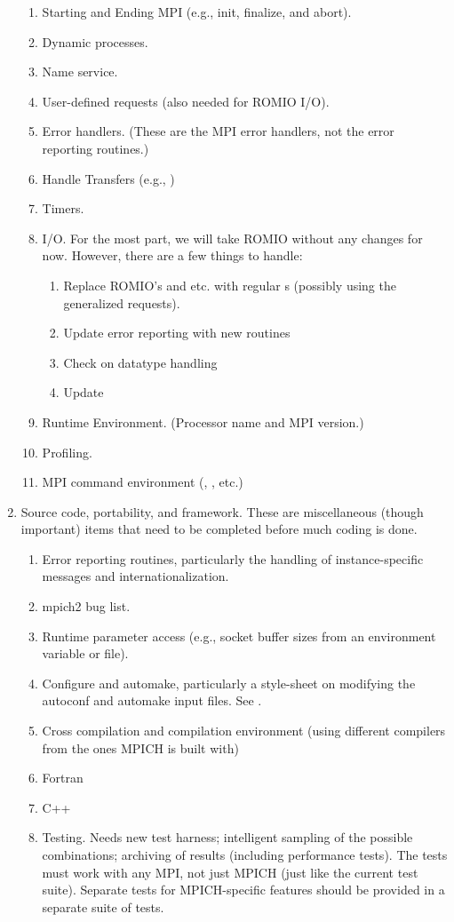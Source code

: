 \documentclass{article}
\begin{document}
\begin{enumerate}
\begin{enumerate}
  \item Starting and Ending MPI (e.g., init, finalize, and abort).
  \item Dynamic processes.
  \item Name service.
  \item User-defined requests (also needed for ROMIO I/O).
  \item Error handlers. (These are the MPI error handlers, not the error
    reporting routines.)
  \item Handle Transfers (e.g., )
  \item Timers.
  \item I/O.  For the most part, we will take ROMIO without any changes for
    now.  However, there are a few things to handle:
    \begin{enumerate}
    \item Replace ROMIO's  and  etc. with
      regular s (possibly using the generalized requests).
    \item Update error reporting with new routines
    \item Check on datatype handling
    \item Update 
    \end{enumerate}
  \item Runtime Environment.  (Processor name and MPI version.)
  \item Profiling.
  \item MPI command environment (, , etc.)
  \end{enumerate}
\item Source code, portability, and framework.
  These are miscellaneous (though important) items that need to be completed
  before much coding is done.

  \begin{enumerate}
  \item Error reporting routines, particularly the handling of
    instance-specific messages and internationalization.
  \item mpich2 bug list.
  \item Runtime parameter access (e.g., socket buffer sizes from an
    environment variable or  file).
  \item Configure and automake, particularly a style-sheet on modifying the
    autoconf and automake input files.  See .
  \item Cross compilation and compilation environment (using different
    compilers from the ones MPICH is built with)
  \item Fortran
  \item C++
  \item Testing.  Needs new test harness; intelligent sampling of the possible
    combinations; archiving of results (including performance tests).  The
    tests must work with any MPI, not just MPICH (just like the current test
    suite).  Separate tests for MPICH-specific features should be provided in
    a separate suite of tests.
  \end{enumerate}
\end{enumerate}
\end{document}

